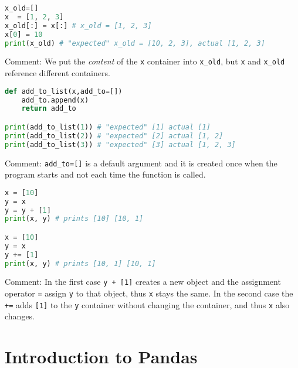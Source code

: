 \documentclass[graybox,sectrefs,envcountresetchap,open=right,final]{svmonodo}
\begin{document}
\begin{lstlisting}[language=python,style=blue1bar]
x_old=[]
x  = [1, 2, 3]
x_old[:] = x[:] # x_old = [1, 2, 3]
x[0] = 10
print(x_old) # "expected" x_old = [10, 2, 3], actual [1, 2, 3] 

\end{lstlisting}

Comment: We put the \emph{content} of the \texttt{x} container into \Verb!x_old!, but \texttt{x} and \Verb!x_old! reference different containers.  








\begin{lstlisting}[language=python,style=blue1bar]
def add_to_list(x,add_to=[])
    add_to.append(x)
    return add_to

print(add_to_list(1)) # "expected" [1] actual [1]
print(add_to_list(2)) # "expected" [2] actual [1, 2]
print(add_to_list(3)) # "expected" [3] actual [1, 2, 3]

\end{lstlisting}

Comment: \Verb!add_to=[]! is a default argument and it is created once when the program starts and not each time the function is called.










\begin{lstlisting}[language=python,style=blue1bar]
x = [10]
y = x
y = y + [1]
print(x, y) # prints [10] [10, 1]

x = [10]
y = x
y += [1] 
print(x, y) # prints [10, 1] [10, 1]

\end{lstlisting}

Comment: In the first case \texttt{y + [1]} creates a new object and the assignment operator \texttt{=} assign \texttt{y} to that object, thus \texttt{x} stays the same. In the second case the \texttt{+=} adds \texttt{[1]} to the \texttt{y} container without changing the container, and thus \texttt{x} also changes.

\chapter{Introduction to Pandas}
\label{ch:pan}
\end{document}
